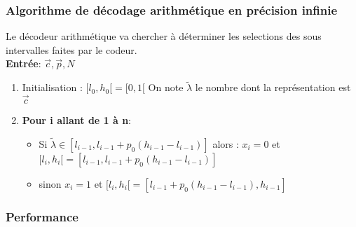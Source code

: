 \documentclass[main.tex]{subfiles}
\begin{document}
\subsubsection{Algorithme de décodage arithmétique en précision infinie}
Le décodeur arithmétique va chercher à déterminer les selections des sous intervalles faites par le codeur.\\

\textbf{Entrée}: $\vec{c},\vec{p},N$
\begin{enumerate}
\item Initialisation : $[l_0,h_0[ = [0,1[$
  On note $\tilde{\lambda}$ le nombre dont la représentation est $\vec{c}$

\item \textbf{Pour i allant de 1 à n}:

  \begin{itemize}
  \item Si $\tilde{\lambda}\in[l_{i-1},l_{i-1}+p_0(h_{i-1}-l_{i-1})]$ alors : $x_i=0$ et $[l_i,h_i[ = [l_{i-1},l_{i-1}+p_0(h_{i-1}-l_{i-1})]$
  \item sinon $x_i=1$ et $[l_i,h_i[ = [l_{i-1}+p_0(h_{i-1}-l_{i-1}),h_{i-1}]$
    \end{itemize}
  \end{enumerate}

\subsubsection{Performance}
\end{document}

